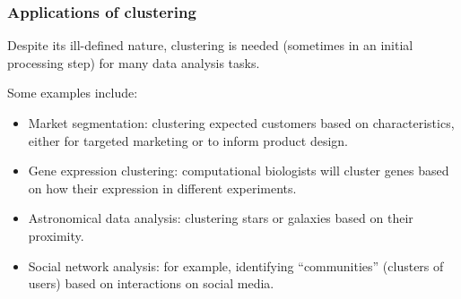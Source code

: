 \documentclass[smaller]{beamer}
\theoremstyle{example}
\begin{document}
\begin{frame}
    \frametitle{Applications of clustering}
    Despite its ill-defined nature, clustering is needed (sometimes in an initial processing step) for many data analysis tasks. 

    Some examples include:
    \begin{itemize}
        \item Market segmentation: clustering expected customers based on characteristics, either for targeted marketing or to inform product design.
        \item Gene expression clustering: computational biologists will cluster genes based on how their expression in different experiments.
        \item Astronomical data analysis: clustering stars or galaxies based on their proximity.
        \item Social network analysis: for example, identifying ``communities'' (clusters of users) based on interactions on social media.
    \end{itemize}
\end{frame}
\end{document}
